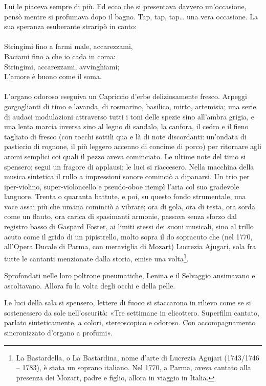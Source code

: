 \documentclass[
a5paper, %
10pt, %
twoside, 
onecolumn, %
openany, %
]{memoir}
\begin{document}
Lui le piaceva sempre di più. Ed ecco che si presentava davvero un’occasione, pensò mentre si profumava dopo il bagno. Tap, tap, tap… una vera occasione. La sua speranza esuberante straripò in canto:
\leavevmode\\\leavevmode\\
{\tiny Stringimi fino a farmi male, accarezzami,\\
Baciami fino a che io cada in coma:\\
Stringimi, accarezzami, avvinghiami;\\
L’amore è buono come il soma.}
\leavevmode\\\leavevmode\\
L’organo odoroso eseguiva un Capriccio d’erbe deliziosamente fresco. Arpeggi gorgoglianti di timo e lavanda, di rosmarino, basilico, mirto, artemisia; una serie di audaci modulazioni attraverso tutti i toni delle spezie sino all’ambra grigia, e una lenta marcia inversa sino al legno di sandalo, la canfora, il cedro e il fieno tagliato di fresco (con tocchi sottili qua e là di note discordanti: un’ondata di pasticcio di rognone, il più leggero accenno di concime di porco) per ritornare agli aromi semplici coi quali il pezzo aveva cominciato. Le ultime note del timo si spensero; segui un fragore di applausi; le luci si riaccesero. Nella macchina della musica sintetica il rullo a impressioni sonore cominciò a dipanarsi. Un trio per iper-violino, super-violoncello e pseudo-oboe riempì l’aria col suo gradevole languore. Trenta o quaranta battute, e poi, su questo fondo strumentale, una voce assai più che umana cominciò a vibrare; ora di gola, ora di testa, ora sorda come un flauto, ora carica di spasimanti armonie, passava senza sforzo dal registro basso di Gaspard Foster, ai limiti stessi dei suoni musicali, sino al trillo acuto come il grido di un pipistrello, molto sopra il do sopracuto che (nel 1770, all’Opera Ducale di Parma, con meraviglia di Mozart) Lucrezia Ajugari, sola fra tutte le cantanti menzionate dalla storia, emise una volta\footnote{La Bastardella, o La Bastardina, nome d’arte di Lucrezia Agujari (1743/1746 – 1783), è stata un soprano italiano. Nel 1770, a Parma, aveva cantato alla presenza dei Mozart, padre e figlio, allora in viaggio in Italia.}.

Sprofondati nelle loro poltrone pneumatiche, Lenina e il Selvaggio ansimavano e ascoltavano. Allora fu la volta degli occhi e della pelle.

Le luci della sala si spensero, lettere di fuoco si staccarono in rilievo come se si sostenessero da sole nell’oscurità: «Tre settimane in elicottero. Superfilm cantato, parlato sinteticamente, a colori, stereoscopico e odoroso. Con accompagnamento sincronizzato d’organo a profumi».
\end{document}
